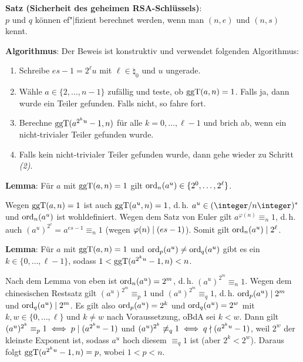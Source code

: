 \textbf{Satz (Sicherheit des geheimen RSA-Schlüssels)}:\\
$p$ und $q$ können ef"|fizient berechnet werden, wenn man $(n, e)$ und $(n, s)$ kennt.

\linie

\textbf{Algorithmus}:
Der Beweis ist konstruktiv und verwendet folgenden Algorithmus:
\begin{enumerate}
    \item
    Schreibe $es - 1 = 2^\ell u$ mit $\ell \in \natural_0$ und $u$ ungerade.

    \item
    Wähle $a \in \{2, \dotsc, n - 1\}$ zufällig und teste, ob $\operatorname{ggT}(a, n) = 1$.
    Falls ja, dann wurde ein Teiler gefunden.
    Falls nicht, so fahre fort.

    \item
    Berechne $\operatorname{ggT}(a^{2^k u} - 1, n)$ für alle $k = 0, \dotsc, \ell - 1$ und brich ab,
    wenn ein nicht-trivialer Teiler gefunden wurde.

    \item
    Falls kein nicht-trivialer Teiler gefunden wurde, dann gehe wieder zu Schritt \emph{(2)}.
\end{enumerate}

\linie

\textbf{Lemma}:
Für $a$ mit $\operatorname{ggT}(a, n) = 1$ gilt $\operatorname{ord}_n(a^u) \in \{2^0, \dotsc, 2^\ell\}$.

\begin{Beweis}
    Wegen $\operatorname{ggT}(a, n) = 1$ ist auch $\operatorname{ggT}(a^u, n) = 1$, d.\,h. $a^u \in (\ZnZ)^\ast$ und
    $\operatorname{ord}_n(a^u)$ ist wohldefiniert.
    Wegen dem Satz von Euler gilt $a^{\varphi(n)} \equiv_n 1$, d.\,h. auch
    $(a^u)^{2^\ell} = a^{es-1} \equiv_n 1$ (wegen $\varphi(n) \mid (es - 1)$).
    Somit gilt $\operatorname{ord}_n(a^u) \mid 2^\ell$.
\end{Beweis}

\textbf{Lemma}:
Für $a$ mit $\operatorname{ggT}(a, n) = 1$ und $\operatorname{ord}_p(a^u) \not= \operatorname{ord}_q(a^u)$ gibt es ein
$k \in \{0, \dotsc, \ell - 1\}$, sodass $1 < \operatorname{ggT}(a^{2^k u} - 1, n) < n$.

\begin{Beweis}
    Nach dem Lemma von eben ist $\operatorname{ord}_n(a^u) = 2^m$, d.\,h. $(a^u)^{2^m} \equiv_n 1$.
    Wegen dem chinesischen Restsatz gilt $(a^u)^{2^m} \equiv_p 1$ und
    $(a^u)^{2^m} \equiv_q 1$, d.\,h. $\operatorname{ord}_p(a^u) \mid 2^m$ und $\operatorname{ord}_q(a^u) \mid 2^m$.
    Es gilt also $\operatorname{ord}_p(a^u) = 2^k$ und $\operatorname{ord}_q(a^u) = 2^w$ mit $k, w \in \{0, \dotsc, \ell\}$
    und $k \not= w$ nach Voraussetzung, oBdA sei $k < w$.
    Dann gilt $(a^u)^{2^k} \equiv_p 1 \iff p \mid (a^{2^k u} - 1)$ und
    $(a^u)^{2^k} \not\equiv_q 1 \iff q \nmid (a^{2^k u} - 1)$,
    weil $2^w$ der kleinste Exponent ist, sodass $a^u$ hoch diesem $\equiv_q 1$ ist
    (aber $2^k < 2^w$).
    Daraus folgt $\operatorname{ggT}(a^{2^k u} - 1, n) = p$, wobei $1 < p < n$.
\end{Beweis}

